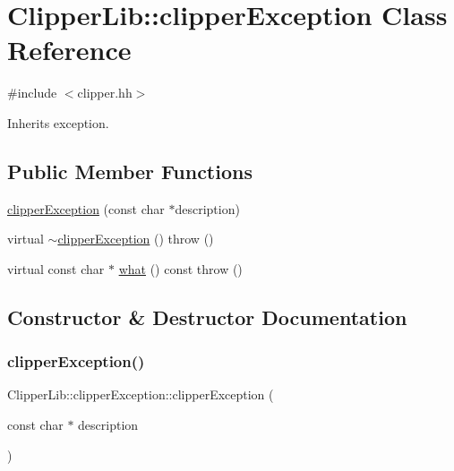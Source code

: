 \hypertarget{class_clipper_lib_1_1clipper_exception}{}\section{Clipper\+Lib\+::clipper\+Exception Class Reference}
\label{class_clipper_lib_1_1clipper_exception}


{\ttfamily \#include $<$clipper.\+hh$>$}



Inherits exception.

\subsection*{Public Member Functions}
\begin{DoxyCompactItemize}
\item 
\mbox{\hyperlink{class_clipper_lib_1_1clipper_exception_a7d44b32d06cd870500355667f6e0d6ed}{clipper\+Exception}} (const char $\ast$description)
\item 
virtual \mbox{\hyperlink{class_clipper_lib_1_1clipper_exception_ae64ee27d7b74c6f4f62aaf466bfc9c19}{$\sim$clipper\+Exception}} ()  throw ()
\item 
virtual const char $\ast$ \mbox{\hyperlink{class_clipper_lib_1_1clipper_exception_a32b7ac5a3176d9040ef0a863fd54657a}{what}} () const  throw ()
\end{DoxyCompactItemize}


\subsection{Constructor \& Destructor Documentation}
\mbox{\label{class_clipper_lib_1_1clipper_exception_a7d44b32d06cd870500355667f6e0d6ed}} 
\subsubsection{\texorpdfstring{clipperException()}{clipperException()}}
{\footnotesize\ttfamily Clipper\+Lib\+::clipper\+Exception\+::clipper\+Exception (\begin{DoxyParamCaption}\item[{const char $\ast$}]{description }\end{DoxyParamCaption})\hspace{0.3cm}{\ttfamily [inline]}}

